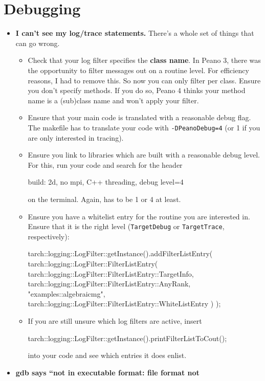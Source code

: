 \section{Debugging}
\begin{itemize}
  \item \textbf{I can't see my log/trace statements.} There's a whole set of
    things that can go wrong.
    \begin{itemize}
      \item Check that your log filter specifies the {\bf class name}. In Peano
      3, there was the opportunity to filter messages out on a routine level.
      For efficiency reasons, I had to remove this. So now you can only filter
      per class. Ensure you don't specify methods. If you do so, Peano 4 thinks
      your method name is a (sub)class name and won't apply your filter.
      \item Ensure that your main code is translated with
      a reasonable debug flag. The makefile has to translate your code with
      \texttt{-DPeanoDebug=4} (or 1 if you are only interested in tracing).
      \item     Ensure you link to libraries which are built with a reasonable debug level. 
    For this, run your code and search for the header
    \begin{code}
build: 2d, no mpi, C++ threading, debug level=4
    \end{code}
    on the terminal. Again, has to be 1 or 4 at least.
    \item Ensure you have a
    whitelist entry for the routine you are interested in. Ensure that it is the
    right level (\texttt{TargetDebug} or \texttt{TargetTrace}, respectively):
    \begin{code}
tarch::logging::LogFilter::getInstance().addFilterListEntry( 
  tarch::logging::LogFilter::FilterListEntry(
    tarch::logging::LogFilter::FilterListEntry::TargetInfo,
    tarch::logging::LogFilter::FilterListEntry::AnyRank,
    "examples::algebraicmg",
    tarch::logging::LogFilter::FilterListEntry::WhiteListEntry
  )
);
    \end{code}
    \item If you are still unsure which log filters are active, insert
    \begin{code}
tarch::logging::LogFilter::getInstance().printFilterListToCout();
    \end{code}
    into your code and see which entries it does enlist.
  \end{itemize}
  \item \textbf{gdb says ``not in executable format: file format not
}
\end{itemize}
